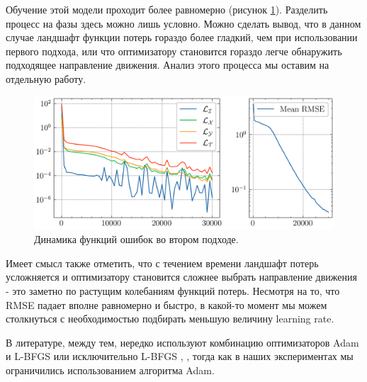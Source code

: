 \documentclass[a4paper, 12pt]{article}
\begin{document}
Обучение этой модели проходит более равномерно (рисунок \ref{fig:lotkavolterra:second:losses}). Разделить процесс на фазы здесь можно лишь условно. Можно сделать вывод, что в данном случае ландшафт функции потерь гораздо более гладкий, чем при использовании первого подхода, или что оптимизатору становится гораздо легче обнаружить подходящее направление движения. Анализ этого процесса мы оставим на отдельную работу.

\begin{figure}[h]
    \centering
    \includegraphics{../images/lotkavolterra/second approach/Losses.png}
    \caption{Динамика функций ошибок во втором подходе.}
    \label{fig:lotkavolterra:second:losses}
\end{figure}

Имеет смысл также отметить, что с течением времени ландшафт потерь усложняется и оптимизатору становится сложнее выбрать направление движения - это заметно по растущим колебаниям функций потерь. Несмотря на то, что RMSE падает вполне равномерно и быстро, в какой-то момент мы можем столкнуться с необходимостью подбирать меньшую величину learning rate. 

В литературе, между тем, нередко используют комбинацию оптимизаторов Adam и L-BFGS или исключительно L-BFGS \cite{Cuomo2022}, \cite{RAISSI2019686}, тогда как в наших экспериментах мы ограничились использованием алгоритма Adam.

\end{document}
